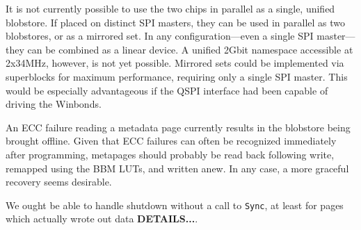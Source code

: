 \documentclass[letterpaper,10pt]{article}
\begin{document}
It is not currently possible to use the two chips in parallel as a single,
unified blobstore. If placed on distinct SPI masters, they can be used in
parallel as two blobstores, or as a mirrored set. In any configuration---even
a single SPI master---they can be combined as a linear device. A unified
2Gbit namespace accessible at 2x34MHz, however, is not yet possible. Mirrored
sets could be implemented via superblocks for
maximum performance, requiring only a single SPI master. This would be especially
advantageous if the QSPI interface had been capable of driving the Winbonds.

An ECC failure reading a metadata page currently results in the blobstore being
brought offline. Given that ECC failures can often be recognized immediately
after programming, metapages should probably be read back following write,
remapped using the BBM LUTs, and written anew. In any case, a more graceful
recovery seems desirable.

We ought be able to handle shutdown without a call to \texttt{Sync}, at least
for pages which actually wrote out data \textbf{DETAILS...}.

\printbibliography
\end{document}
